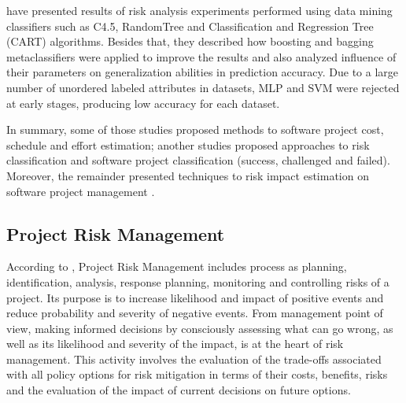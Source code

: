 \documentclass[a4paper,twoside]{article}
\begin{document}
\cite{dzega2010classification} have presented results of risk analysis experiments performed using data mining classifiers such as C4.5, RandomTree and Classification and Regression Tree (CART) algorithms. Besides that, they described how boosting and bagging metaclassifiers were applied to improve the results and also analyzed influence of their parameters on generalization abilities in prediction accuracy. Due to a large number of unordered labeled attributes in datasets, MLP and SVM were rejected at early stages, producing low accuracy for each dataset.

In summary, some of those studies proposed methods to software project cost, schedule and effort estimation; another studies proposed approaches to risk classification and software project classification (success, challenged and failed). Moreover, the remainder presented techniques to risk impact estimation on software project management \cite{yu2011software} \cite{saxena2012software} \cite{lazzerini2011analyzing} \cite{dzega2010classification}.

\subsection{Project Risk Management}

\noindent According to \cite{PMBOK2008}, Project Risk Management includes process as planning, identification, analysis, response planning, monitoring and controlling risks of a project. Its purpose is to increase likelihood and impact of positive events and reduce probability and severity of negative events. From management point of view, making informed decisions by consciously assessing what can go wrong, as well as its likelihood and severity of the impact, is at the heart of risk management. This activity involves the evaluation of the trade-offs associated with all policy options for risk mitigation in terms of their costs, benefits, risks and the evaluation of the impact of current decisions on future options.
\end{document}
